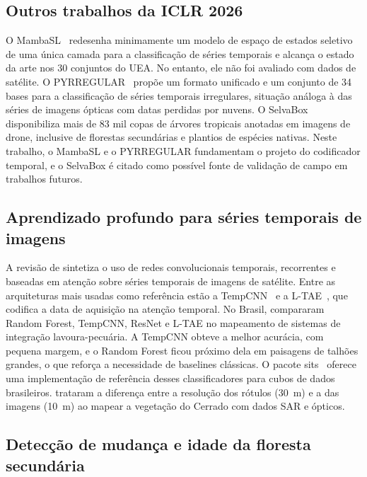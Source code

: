 \documentclass[conference]{IEEEtran}
\begin{document}
\subsection{Outros trabalhos da ICLR 2026}

O MambaSL~\citep{jung2026mambasl} redesenha minimamente um modelo de espaço de estados seletivo~\citep{gu2023mamba} de uma única camada para a classificação de séries temporais e alcança o estado da arte nos 30 conjuntos do UEA. No entanto, ele não foi avaliado com dados de satélite. O PYRREGULAR~\citep{spinnato2026pyrregular} propõe um formato unificado e um conjunto de 34 bases para a classificação de séries temporais irregulares, situação análoga à das séries de imagens ópticas com datas perdidas por nuvens. O SelvaBox~\citep{baudchon2026selvabox} disponibiliza mais de 83 mil copas de árvores tropicais anotadas em imagens de drone, inclusive de florestas secundárias e plantios de espécies nativas. Neste trabalho, o MambaSL e o PYRREGULAR fundamentam o projeto do codificador temporal, e o SelvaBox é citado como possível fonte de validação de campo em trabalhos futuros.

\subsection{Aprendizado profundo para séries temporais de imagens}

A revisão de \citet{miller2024} sintetiza o uso de redes convolucionais temporais, recorrentes e baseadas em atenção sobre séries temporais de imagens de satélite. Entre as arquiteturas mais usadas como referência estão a TempCNN~\citep{pelletier2019} e a L-TAE~\citep{garnot2020ltae}, que codifica a data de aquisição na atenção temporal. No Brasil, \citet{werner2024} compararam Random Forest, TempCNN, ResNet e L-TAE no mapeamento de sistemas de integração lavoura-pecuária. A TempCNN obteve a melhor acurácia, com pequena margem, e o Random Forest ficou próximo dela em paisagens de talhões grandes, o que reforça a necessidade de baselines clássicas. O pacote sits~\citep{simoes2021} oferece uma implementação de referência desses classificadores para cubos de dados brasileiros. \citet{silvafilho2024} trataram a diferença entre a resolução dos rótulos (30~m) e a das imagens (10~m) ao mapear a vegetação do Cerrado com dados SAR e ópticos.

\subsection{Detecção de mudança e idade da floresta secundária}
\end{document}
